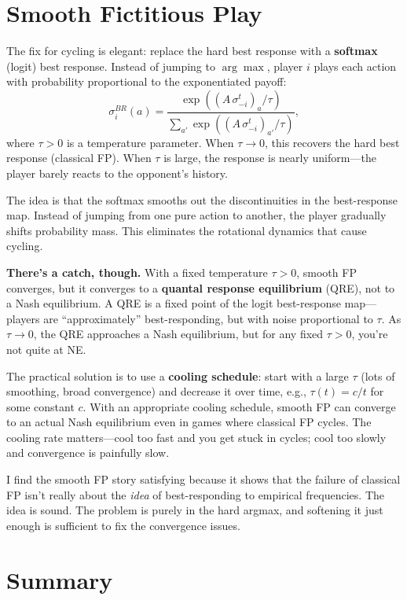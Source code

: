 \documentclass[11pt]{article}
\begin{document}
\section{Smooth Fictitious Play}

The fix for cycling is elegant: replace the hard best response with a \textbf{softmax} (logit) best response. Instead of jumping to $\arg\max$, player $i$ plays each action with probability proportional to the exponentiated payoff:
\[
\sigma_i^{BR}(a) = \frac{\exp\left( (A \, \sigma_{-i}^t)_a / \tau \right)}{\sum_{a'} \exp\left( (A \, \sigma_{-i}^t)_{a'} / \tau \right)},
\]
where $\tau > 0$ is a temperature parameter. When $\tau \to 0$, this recovers the hard best response (classical FP). When $\tau$ is large, the response is nearly uniform---the player barely reacts to the opponent's history.

The idea is that the softmax smooths out the discontinuities in the best-response map. Instead of jumping from one pure action to another, the player gradually shifts probability mass. This eliminates the rotational dynamics that cause cycling.

\textbf{There's a catch, though.} With a fixed temperature $\tau > 0$, smooth FP converges, but it converges to a \textbf{quantal response equilibrium} (QRE), not to a Nash equilibrium. A QRE is a fixed point of the logit best-response map---players are ``approximately'' best-responding, but with noise proportional to $\tau$. As $\tau \to 0$, the QRE approaches a Nash equilibrium, but for any fixed $\tau > 0$, you're not quite at NE.

The practical solution is to use a \textbf{cooling schedule}: start with a large $\tau$ (lots of smoothing, broad convergence) and decrease it over time, e.g., $\tau(t) = c/t$ for some constant $c$. With an appropriate cooling schedule, smooth FP can converge to an actual Nash equilibrium even in games where classical FP cycles. The cooling rate matters---cool too fast and you get stuck in cycles; cool too slowly and convergence is painfully slow.

I find the smooth FP story satisfying because it shows that the failure of classical FP isn't really about the \emph{idea} of best-responding to empirical frequencies. The idea is sound. The problem is purely in the hard argmax, and softening it just enough is sufficient to fix the convergence issues.

\section{Summary}
\end{document}
